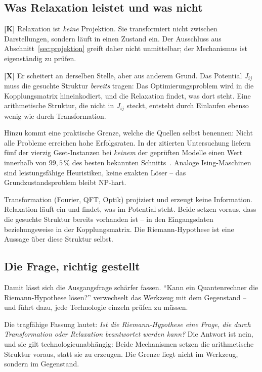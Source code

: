 \subsection{Was Relaxation leistet und was nicht}

\textbf{[K]} Relaxation ist \emph{keine} Projektion. Sie transformiert
nicht zwischen Darstellungen, sondern l\"auft in einen Zustand ein. Der
Ausschluss aus Abschnitt~\ref{sec:projektion} greift daher nicht
unmittelbar; der Mechanismus ist eigenst\"andig zu pr\"ufen.

\textbf{[X]} Er scheitert an derselben Stelle, aber aus anderem Grund. Das
Potential $J_{ij}$ muss die gesuchte Struktur \emph{bereits} tragen: Das
Optimierungsproblem wird in die Kopplungsmatrix hineinkodiert, und die
Relaxation findet, was dort steht. Eine arithmetische Struktur, die nicht
in $J_{ij}$ steckt, entsteht durch Einlaufen ebenso wenig wie durch
Transformation.

Hinzu kommt eine praktische Grenze, welche die Quellen selbst benennen:
Nicht alle Probleme erreichen hohe Erfolgsraten. In der zitierten
Untersuchung liefern f\"unf der vierzig Gset-Instanzen bei \emph{keinem}
der gepr\"uften Modelle einen Wert innerhalb von $99{,}5\,\%$ des besten
bekannten Schnitts~\cite{mys2025}. Analoge Ising-Maschinen sind
leistungsf\"ahige Heuristiken, keine exakten L\"oser -- das
Grundzustandsproblem bleibt NP-hart.

\begin{keyresult}
Transformation (Fourier, QFT, Optik) projiziert und erzeugt keine
Information. Relaxation l\"auft ein und findet, was im Potential steht.
Beide setzen voraus, dass die gesuchte Struktur bereits vorhanden ist --
in den Eingangsdaten beziehungsweise in der Kopplungsmatrix. Die
Riemann-Hypothese ist eine Aussage \"uber diese Struktur selbst.
\end{keyresult}

\subsection{Die Frage, richtig gestellt}

Damit l\"asst sich die Ausgangsfrage sch\"arfer fassen. \enquote{Kann ein
Quantenrechner die Riemann-Hypothese l\"osen?} verwechselt das Werkzeug
mit dem Gegenstand -- und f\"uhrt dazu, jede Technologie einzeln pr\"ufen
zu m\"ussen.

Die tragf\"ahige Fassung lautet: \emph{Ist die Riemann-Hypothese eine
Frage, die durch Transformation oder Relaxation beantwortet werden kann?}
Die Antwort ist nein, und sie gilt technologieunabh\"angig: Beide
Mechanismen setzen die arithmetische Struktur voraus, statt sie zu
erzeugen. Die Grenze liegt nicht im Werkzeug, sondern im Gegenstand.

